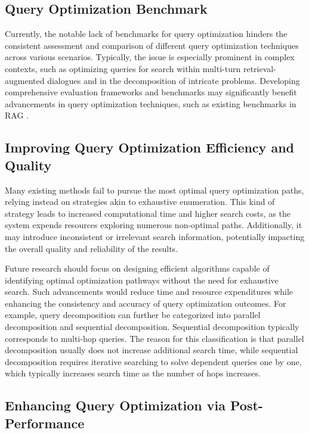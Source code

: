 \documentclass[11pt]{article}
\begin{document}
\subsection{Query Optimization Benchmark}
Currently, the notable lack of benchmarks for query optimization hinders the consistent assessment and comparison of different query optimization techniques across various scenarios. Typically, the issue is especially prominent in complex contexts, such as optimizing queries for search within multi-turn retrieval-augmented dialogues and in the decomposition of intricate problems. Developing comprehensive evaluation frameworks and benchmarks may significantly benefit advancements in query optimization techniques, such as existing benchmarks in RAG \cite{rag_benchmark_1, rag_benchmark_2, rag_benchmark_3}.


\subsection{Improving Query Optimization Efficiency and Quality}
Many existing methods fail to pursue the most optimal query optimization paths, relying instead on strategies akin to exhaustive enumeration. This kind of strategy leads to increased computational time and higher search costs, as the system expends resources exploring numerous non-optimal paths. Additionally, it may introduce inconsistent or irrelevant search information, potentially impacting the overall quality and reliability of the results. 


Future research should focus on designing efficient algorithms capable of identifying optimal optimization pathways without the need for exhaustive search. Such advancements would reduce time and resource expenditures while enhancing the consistency and accuracy of query optimization outcomes. For example, query decomposition can further be categorized into parallel decomposition and sequential decomposition. Sequential decomposition typically corresponds to multi-hop queries. The reason for this classification is that parallel decomposition usually does not increase additional search time, while sequential decomposition requires iterative searching to solve dependent queries one by one, which typically increases search time as the number of hops increases.

\subsection{Enhancing Query Optimization via Post-Performance}
\end{document}
